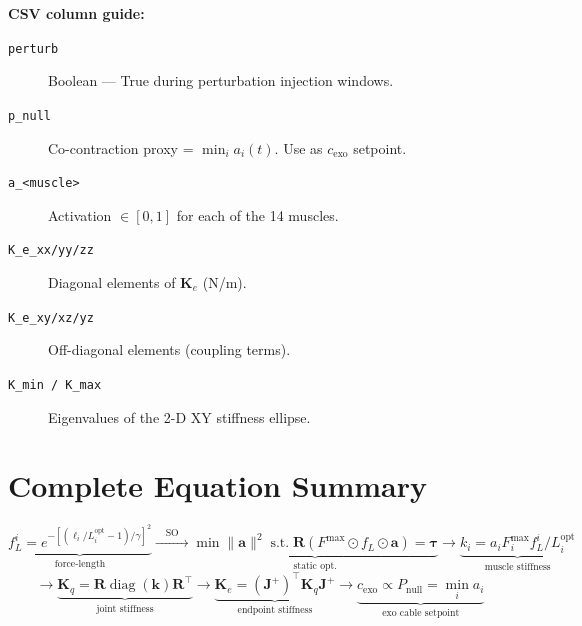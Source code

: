 \documentclass[11pt,a4paper]{article}
\begin{document}
\textbf{CSV column guide:}
\begin{description}
  \item[\texttt{perturb}] Boolean — True during perturbation injection windows.
  \item[\texttt{p\_null}] Co-contraction proxy = $\min_i a_i(t)$. Use as $c_\text{exo}$ setpoint.
  \item[\texttt{a\_<muscle>}] Activation $\in[0,1]$ for each of the 14 muscles.
  \item[\texttt{K\_e\_xx/yy/zz}] Diagonal elements of $\mathbf{K}_e$ (N/m).
  \item[\texttt{K\_e\_xy/xz/yz}] Off-diagonal elements (coupling terms).
  \item[\texttt{K\_min / K\_max}] Eigenvalues of the 2-D XY stiffness ellipse.
\end{description}

\section{Complete Equation Summary}

\[
  \underbrace{f_L^i = e^{-[(\ell_i/L_i^\text{opt}-1)/\gamma]^2}}_{\text{force-length}}
  \xrightarrow{\quad\text{SO}\quad}
  \underbrace{\min\|\bm{a}\|^2 \;\text{s.t.}\;
    \mathbf{R}(F^\text{max}\odot f_L\odot\bm{a})=\bm{\tau}}_{\text{static opt.}}
  \xrightarrow{\quad}
  \underbrace{k_i = a_i F_i^\text{max} f_L^i / L_i^\text{opt}}_{\text{muscle stiffness}}
\]
\[
  \xrightarrow{\quad}
  \underbrace{\mathbf{K}_q = \mathbf{R}\operatorname{diag}(\bm{k})\mathbf{R}^\top}_{\text{joint stiffness}}
  \xrightarrow{\quad}
  \underbrace{\mathbf{K}_e = (\mathbf{J}^+)^\top \mathbf{K}_q \mathbf{J}^+}_{\text{endpoint stiffness}}
  \xrightarrow{\quad}
  \underbrace{c_\text{exo} \propto P_\text{null} = \min_i a_i}_{\text{exo cable setpoint}}
\]
\end{document}
